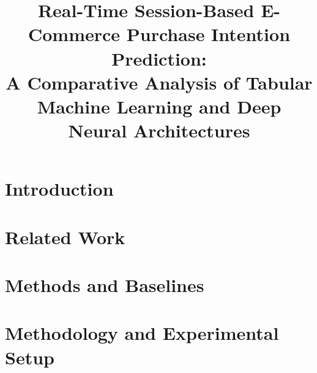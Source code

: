 \documentclass[conference]{IEEEtran}
\begin{document}
\title{Real-Time Session-Based E-Commerce Purchase Intention Prediction:\\
A Comparative Analysis of Tabular Machine Learning and Deep Neural Architectures}

\author{
\and
{}
}

\maketitle

\begin{abstract}
\end{abstract}

\section{Introduction}

\section{Related Work}

\section{Methods and Baselines}

\section{Methodology and Experimental Setup}
\end{document}
